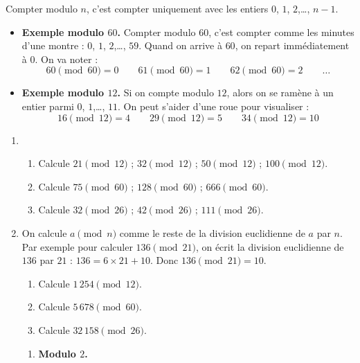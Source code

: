 \documentclass[class=report,crop=false, 12pt]{standalone}
\begin{document}
\begin{activite}[Modulo]
Compter modulo $n$, c'est compter uniquement avec les entiers $0$, $1$, $2$,\ldots, $n-1$.
\begin{itemize}
  \item \textbf{Exemple modulo $60$.} 
  Compter modulo $60$, c'est compter comme les minutes d'une montre : $0$, $1$, $2$,\ldots, $59$. Quand on arrive à $60$, on repart immédiatement à $0$.
On va noter : 
$$60 \pmod{60} = 0 \qquad 61 \pmod{60} = 1 \qquad  62 \pmod{60} = 2 \qquad \ldots $$

  \item \textbf{Exemple modulo $12$.} 
  Si on compte modulo $12$, alors on se ramène à un entier parmi $0$, $1$,\ldots, $11$.
  On peut s'aider d'une roue pour visualiser :
  $$16 \pmod{12} = 4 \qquad 29 \pmod{12} = 5 \qquad  34 \pmod{12} = 10$$
 
  
\end{itemize}

\begin{enumerate}
  \item 
  \begin{enumerate}
    \item Calcule $21 \pmod{12}$ ; $32 \pmod{12}$ ; $50 \pmod{12}$ ; $100 \pmod{12}$.
    \item Calcule $75 \pmod{60}$ ; $128 \pmod{60}$ ; $666 \pmod{60}$.
    \item Calcule $32 \pmod{26}$ ; $42 \pmod{26}$ ; $111 \pmod{26}$.
  \end{enumerate}
  
  \item On calcule $a \pmod{n}$ comme le reste de la division euclidienne de $a$ par $n$.
  Par exemple pour calculer $136 \pmod{21}$, on écrit la division euclidienne de $136$ par $21$ : $136 =  6 \times 21 + 10$. Donc $136 \pmod{21} = 10$.


  \begin{enumerate}
    \item Calcule $1\,254 \pmod{12}$.
    \item Calcule $5\,678 \pmod{60}$.
    \item Calcule $32\,158 \pmod{26}$.
  \end{enumerate}  
  
  \begin{enumerate}
    \item \textbf{Modulo $2$.}
    

\end{enumerate}
\end{enumerate}
\end{activite}
\end{document}
